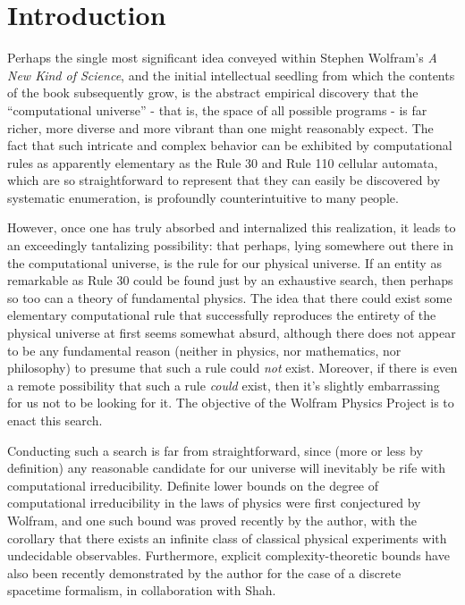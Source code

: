 \documentclass{article}
\begin{document}
\section{Introduction}
\label{sec:CurrentStatus0}

Perhaps the single most significant idea conveyed within Stephen Wolfram's \textit{A New Kind of Science}\cite{wolfram}, and the initial intellectual seedling from which the contents of the book subsequently grow, is the abstract empirical discovery that the ``computational universe'' - that is, the space of all possible programs - is far richer, more diverse and more vibrant than one might reasonably expect. The fact that such intricate and complex behavior can be exhibited by computational rules as apparently elementary as the Rule 30\cite{wolfram2}\cite{wolfram3} and Rule 110\cite{cook}\cite{cook2} cellular automata, which are so straightforward to represent that they can easily be discovered by systematic enumeration, is profoundly counterintuitive to many people.

However, once one has truly absorbed and internalized this realization, it leads to an exceedingly tantalizing possibility: that perhaps, lying somewhere out there in the computational universe, is the rule for our physical universe\cite{wolfram4}. If an entity as remarkable as Rule 30 could be found just by an exhaustive search, then perhaps so too can a theory of fundamental physics. The idea that there could exist some elementary computational rule that successfully reproduces the entirety of the physical universe at first seems somewhat absurd, although there does not appear to be any fundamental reason (neither in physics, nor mathematics, nor philosophy) to presume that such a rule could \textit{not} exist. Moreover, if there is even a remote possibility that such a rule \textit{could} exist, then it's slightly embarrassing for us not to be looking for it. The objective of the Wolfram Physics Project is to enact this search.

Conducting such a search is far from straightforward, since (more or less by definition) any reasonable candidate for our universe will inevitably be rife with computational irreducibility. Definite lower bounds on the degree of computational irreducibility in the laws of physics were first conjectured by Wolfram\cite{wolfram5}, and one such bound was proved recently by the author\cite{gorard}, with the corollary that there exists an infinite class of classical physical experiments with undecidable observables. Furthermore, explicit complexity-theoretic bounds have also been recently demonstrated by the author for the case of a discrete spacetime formalism, in collaboration with Shah\cite{shah}.
\end{document}
